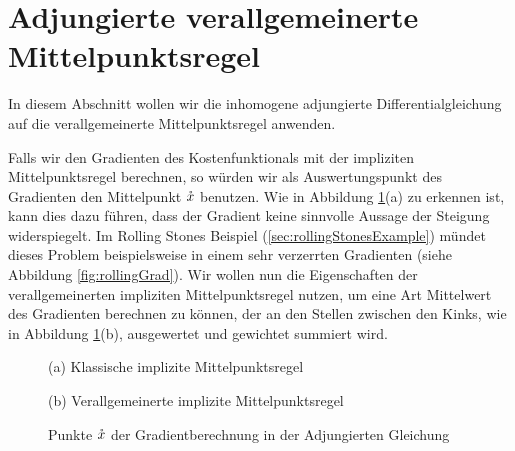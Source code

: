 \section{Adjungierte verallgemeinerte Mittelpunktsregel}

In diesem Abschnitt wollen wir die inhomogene adjungierte Differentialgleichung auf die verallgemeinerte Mittelpunktsregel anwenden.

Falls wir den Gradienten des Kostenfunktionals mit der impliziten Mittelpunktsregel berechnen, so würden wir als Auswertungspunkt des Gradienten den Mittelpunkt $\mathring{x}$ benutzen. Wie in Abbildung \ref{fig:multipleKinksAdjoint}(a) zu erkennen ist, kann dies dazu führen, dass der Gradient keine sinnvolle Aussage der Steigung widerspiegelt. Im Rolling Stones Beispiel (\ref{sec:rollingStonesExample}) mündet dieses Problem beispielsweise in einem sehr verzerrten Gradienten (siehe Abbildung \ref{fig:rollingGrad}). Wir wollen nun die Eigenschaften der verallgemeinerten impliziten Mittelpunktsregel nutzen, um eine Art Mittelwert des Gradienten berechnen zu können, der an den Stellen zwischen den Kinks, wie in Abbildung \ref{fig:multipleKinksAdjoint}(b), ausgewertet und gewichtet summiert wird. 

\begin{figure}
\footnotesize
\centering
\begin{minipage}[b]{\linewidth}

\caption*{(a) Klassische implizite Mittelpunktsregel}
\end{minipage}
\begin{minipage}[b]{\linewidth}

\caption*{(b) Verallgemeinerte implizite Mittelpunktsregel}
\end{minipage}
\caption{Punkte $\mathring{x}$ der Gradientberechnung in der Adjungierten Gleichung}
\label{fig:multipleKinksAdjoint}
\end{figure}


